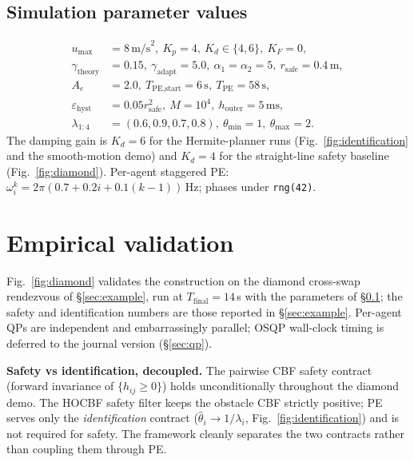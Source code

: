 \documentclass[letterpaper,10pt,conference]{IEEEtran}
\newcommand{\rsafe}{r_{\text{safe}}}
\newcommand{\thmin}{\theta_{\min}}
\newcommand{\thmax}{\theta_{\max}}
\newcommand{\thethat}{\hat\theta}
\begin{document}
\subsection{Simulation parameter values}\label{sec:params}
\begin{align}
u_{\max} &= 8\,\text{m/s}^2,\ K_p = 4,\ K_d \in \{4, 6\},\ K_F = 0,\nonumber\\
\gamma_{\text{theory}} &= 0.15,\ \gamma_{\text{adapt}} = 5.0,\ \alpha_1 = \alpha_2 = 5,\ \rsafe = 0.4\,\text{m},\nonumber\\
A_e &= 2.0,\ T_{\text{PE,start}} = 6\,\text{s},\ T_{\text{PE}} = 58\,\text{s},\nonumber\\
\varepsilon_{\text{hyst}} &= 0.05\rsafe^2,\ M = 10^4,\ h_{\text{outer}} = 5\,\text{ms},\nonumber\\
\lambda_{1{:}4} &= (0.6, 0.9, 0.7, 0.8),\ \thmin = 1,\ \thmax = 2.\nonumber
\end{align}
The damping gain is $K_d = 6$ for the Hermite-planner runs (Fig.~\ref{fig:identification} and the smooth-motion demo) and $K_d = 4$ for the straight-line safety baseline (Fig.~\ref{fig:diamond}). Per-agent staggered PE: $\omega_i^k = 2\pi(0.7 + 0.2 i + 0.1(k-1))$\,Hz; phases under \texttt{rng(42)}.

\section{Empirical validation}\label{sec:empirical}
Fig.~\ref{fig:diamond} validates the construction on the diamond cross-swap rendezvous of \S\ref{sec:example}, run at $T_{\text{final}} = 14$\,s with the parameters of \S\ref{sec:params}; the safety and identification numbers are those reported in \S\ref{sec:example}. Per-agent QPs are independent and embarrassingly parallel; OSQP wall-clock timing is deferred to the journal version (\S\ref{sec:qp}).

\textbf{Safety vs identification, decoupled.} The pairwise CBF safety contract (forward invariance of $\{h_{ij}\ge 0\}$) holds unconditionally throughout the diamond demo. The HOCBF safety filter keeps the obstacle CBF strictly positive; PE serves only the \emph{identification} contract ($\thethat_i \to 1/\lambda_i$, Fig.~\ref{fig:identification}) and is not required for safety. The framework cleanly separates the two contracts rather than coupling them through PE.
\end{document}
